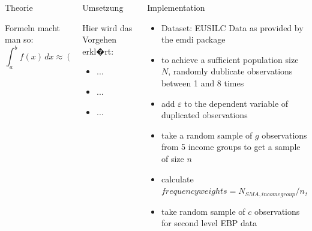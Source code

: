 \documentclass[fleqn,final]{beamer}
\newcommand{\Pheight}{\rule[-5mm]{0cm}{1cm}}
\begin{document}
\begin{frame}
\begin{columns}[t]
  
\begin{column}{.3\linewidth}
    
    


    \begin{block}{Theorie \Pheight}

Formeln macht man so:
$$\int_{a}^{b} f(x)\, dx \approx (b-a)\frac{f(a) + f(b)}{2}$$


\end{block}
\end{column}


%
   
\begin{column}{.3\linewidth}

 \begin{block}{Umsetzung \Pheight}

Hier wird das Vorgehen erkl�rt:
\begin{itemize}
\item ...
\item ...
\item ...
\end{itemize}
\end{block}
\end{column}     



%



\begin{column}{.3\linewidth}


\begin{block}{Implementation \Pheight}
\begin{itemize}
\item Dataset: EUSILC Data as provided by the emdi package
\item to achieve a sufficient population size $N$, randomly dublicate observations between 1 and 8 times
\item add $\varepsilon$ to the dependent variable of duplicated observations
\item take a random sample of $g$ observations from 5 income groups to get a sample of size $n$
\item calculate $frequency weights = N_{SMA,income group}/n_{SMA}/5 $
\item take random sample of $c$ observations for second level EBP data 
 

\end{itemize}
\end{block}
\end{column}
\end{columns}
\end{frame}
\end{document}
